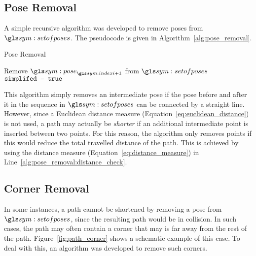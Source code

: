 		\subsection{Pose Removal}%
		\label{sec:pose_removal}

			A simple recursive algorithm was developed to remove poses from
			$\setofposes$. The pseudocode is given in
			Algorithm~\ref{alg:pose_removal}.

			\begin{algorithm}[ht]
				\caption{Pose Removal}
				\label{alg:pose_removal}
				\begin{algorithmic}[1]
						\State{}
						\For{$\indexi \in [0, |\setofposes| -2]$}
							\label{alg:pose_removal:distance_check}
									\State{}Remove $\pose_{\indexi+1}$ from
									$\setofposes$
									\State{}$\texttt{simplifed = true}$
								\EndIf{}
							\EndIf{}
						\EndFor{}
							\State{}
						\EndIf{}
					\EndProcedure{}
				\end{algorithmic}
			\end{algorithm}

			This algorithm simply removes an intermediate pose if the pose
			before and after it in the sequence in $\setofposes$ can be
			connected by a straight line. However, since a Euclidean distance
			measure (Equation~\ref{eq:euclidean_distance}) is not used, a path
			may actually be \textit{shorter} if an additional intermediate point
			is inserted between two points. For this reason, the algorithm only
			removes points if this would reduce the total travelled distance
			of the path. This is achieved by using the distance measure
			(Equation~\ref{eq:distance_measure}) in
			Line~\ref{alg:pose_removal:distance_check}.

		\subsection{Corner Removal}%
		\label{sec:corner_removal}


			In some instances, a path cannot be shortened by removing a pose
			from $\setofposes$, since the resulting path would be in collision.
			In such cases, the path may often contain a corner that may is far
			away from the rest of the path. Figure~\ref{fig:path_corner} shows
			a schematic example of this case. To deal with this, an algorithm
			was developed to remove such corners.

